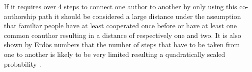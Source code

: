 If it requires over 4 steps to connect one author to another by only using this co-authorship path it should be considered a large distance under the assumption that familiar people have at least cooperated once before or have at least one common coauthor resulting in a distance of respectively one and two.
It is also shown by Erd\"os numbers that the number of steps that have to be taken from one to another is likely to be very limited resulting a quadratically scaled probability \cite{balaban2002co}.
